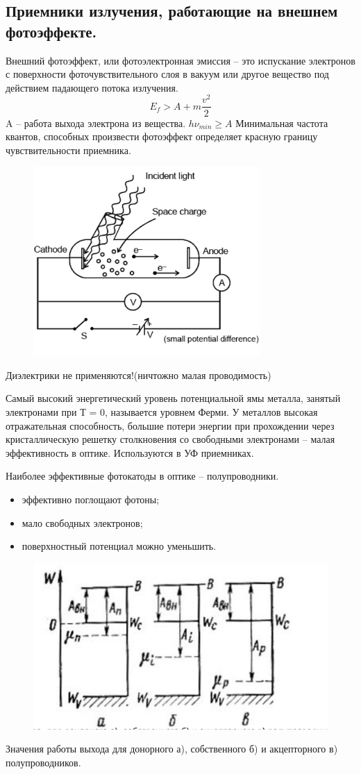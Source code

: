 \documentclass[12pt]{article}
\begin{document}
\subsection{Приемники излучения, работающие на внешнем фотоэффекте.}
Внешний фотоэффект, или фотоэлектронная эмиссия – это испускание электронов с поверхности
фоточувствительного слоя в вакуум или другое вещество под действием падающего потока излучения.
$$E_f > A + m\frac{v^2}{2}$$
A -- работа выхода электрона из вещества. $h\nu_{min}\ge A$
Минимальная частота квантов, способных
произвести фотоэффект определяет красную границу чувствительности приемника.
\begin{figure}[h]
	\centering
	\includegraphics[width=0.5\linewidth]{"Снимок экрана от 2024-12-23 18-41-39"}
\end{figure}
Диэлектрики не применяются!(ничтожно малая проводимость)

Самый высокий энергетический уровень потенциальной
ямы металла, занятый электронами при Т = 0, называется
уровнем Ферми.
У металлов высокая отражательная способность,
большие потери энергии при прохождении через
кристаллическую решетку столкновения со
свободными электронами – малая эффективность
в оптике.
Используются в УФ приемниках.

Наиболее эффективные фотокатоды
в оптике -- полупроводники.
\begin{itemize}
	\item эффективно поглощают фотоны;
	\item мало свободных электронов;
	\item поверхностный потенциал можно
	уменьшить.
\end{itemize}

\begin{figure}[h]
	\centering
	\includegraphics[width=0.5\linewidth]{"Снимок экрана от 2024-12-23 18-45-34"}
\end{figure}
Значения работы выхода для донорного а), собственного б) и акцепторного в) полупроводников.
\end{document}

